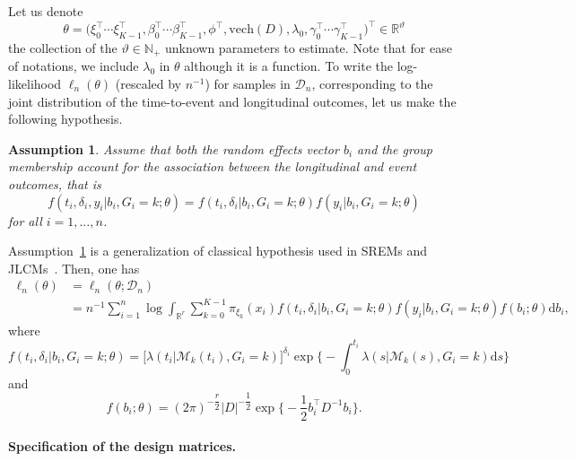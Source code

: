 \documentclass[11pt]{article}
\newtheorem{assumption}{Assumption}{\bf}{\rm}
\newcommand{\dd}{\mathrm{d}}
\newcommand{\cM}{\mathcal M}
\newcommand{\cD}{\mathcal D}
\newcommand{\R}{\mathds R}
\newcommand{\N}{\mathds N}
\begin{document}
Let us denote 
\[ \theta = \big(\xi_0^\top \cdots \xi_{K-1}^\top, \beta_0^\top \cdots \beta_{K-1}^\top, \phi^\top, \text{vech}(D), \lambda_0, \gamma_0^\top \cdots \gamma_{K-1}^\top\big)^\top \in \R^\vartheta \]
the collection of the $\vartheta \in \N_+$ unknown parameters to estimate. Note that for ease of notations, we include $\lambda_0$ in $\theta$ although it is a function.
To write the log-likelihood $\ell_n(\theta)$ (rescaled by $n^{-1}$)  for samples in $\cD_n$, corresponding to the joint distribution of the time-to-event and longitudinal outcomes, let us make the following hypothesis.
\begin{assumption}
\label{indep-hyp-3}
Assume that both the random effects vector $b_i$ and the group membership account for the association between the longitudinal and event outcomes, that is
\begin{equation}
  \label{eq:ind-hyp}
  f(t_i, \delta_i, y_i | b_i, G_i = k ; \theta) = f(t_i, \delta_i| b_i, G_i = k ; \theta) f(y_i | b_i, G_i = k ; \theta)
\end{equation}
for all $i=1, \ldots, n$.
\end{assumption}
Assumption~\ref{indep-hyp-3} is a generalization of classical hypothesis used in SREMs and JLCMs~\citep{hickey2016joint}.
Then, one has
\begin{align}
	\label{eq:log-lik}
	\ell_n(\theta) &= \ell_n(\theta ; \cD_n) \nonumber \\
	&= n^{-1} \sum_{i=1}^n \log \int_{\R^r} \sum_{k=0}^{K-1} \pi_{\xi_k}(x_i) f(t_i, \delta_i| b_i, G_i = k ; \theta) f(y_i | b_i, G_i = k ; \theta) f(b_i ; \theta) \dd b_i,
\end{align}
where 
\[f(t_i, \delta_i| b_i, G_i = k ; \theta) = \big[\lambda(t_i|\cM_k(t_i), G_i = k)\big]^{\delta_i} \exp \Big\{-\int_0^{t_i} \lambda(s|\cM_k(s), G_i = k) \dd s \Big\} \]
and
\begin{equation}
  \label{eq:b_density}
  f(b_i ; \theta) = (2 \pi)^{-\dfrac r2} |D|^{-\dfrac12} \exp \Big\{ -\dfrac12 b_i^\top D^{-1}b_i \Big\}.
\end{equation}

\paragraph{Specification of the design matrices.}
 
\end{document}
